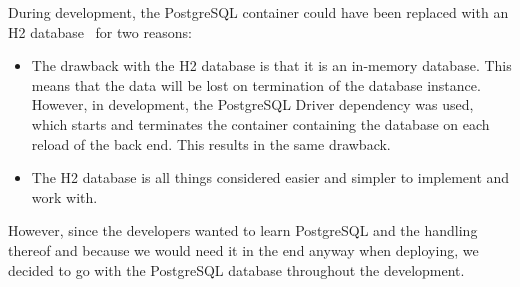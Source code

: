 During development, the PostgreSQL container could have been replaced with
an H2
database~\cite{h22024} for two reasons:

\begin{itemize}
    \item The drawback with the
    H2
    database is that it is an in-memory database.
    This means that the data will be lost on termination of the database instance.
    However, in development, the PostgreSQL Driver dependency was used, which starts and terminates the container
    containing the database on each reload of the back end.
    This results in the same drawback.
    \item The
    H2
    database is all things considered easier and simpler to implement and work with.
\end{itemize}

However, since the developers wanted to learn PostgreSQL and the handling thereof and because we would
need it in the end anyway when deploying, we decided to go with the PostgreSQL database throughout the development.
